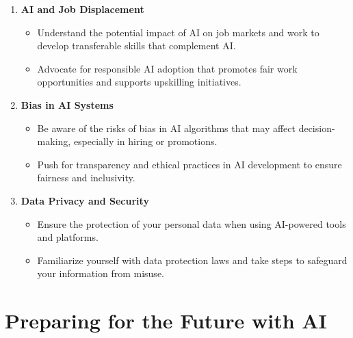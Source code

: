 \documentclass[
  letterpaper,
  DIV=11,
  numbers=noendperiod]{scrreprt}
\providecommand{\tightlist}{%
  \setlength{\itemsep}{0pt}\setlength{\parskip}{0pt}}\usepackage{longtable,booktabs,array}
\begin{document}
\begin{enumerate}
\def\labelenumi{\arabic{enumi}.}
\item
  \textbf{AI and Job Displacement}

  \begin{itemize}
  \tightlist
  \item
    Understand the potential impact of AI on job markets and work to
    develop transferable skills that complement AI.
  \item
    Advocate for responsible AI adoption that promotes fair work
    opportunities and supports upskilling initiatives.
  \end{itemize}
\item
  \textbf{Bias in AI Systems}

  \begin{itemize}
  \tightlist
  \item
    Be aware of the risks of bias in AI algorithms that may affect
    decision-making, especially in hiring or promotions.
  \item
    Push for transparency and ethical practices in AI development to
    ensure fairness and inclusivity.
  \end{itemize}
\item
  \textbf{Data Privacy and Security}

  \begin{itemize}
  \tightlist
  \item
    Ensure the protection of your personal data when using AI-powered
    tools and platforms.
  \item
    Familiarize yourself with data protection laws and take steps to
    safeguard your information from misuse.
  \end{itemize}
\end{enumerate}

\section{Preparing for the Future with
AI}\label{preparing-for-the-future-with-ai}
\end{document}
